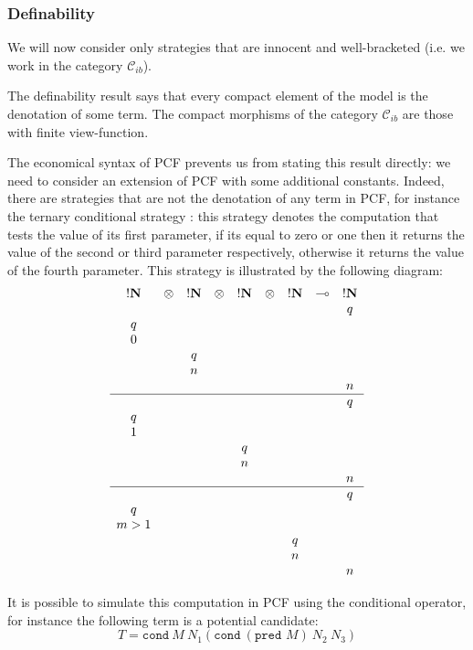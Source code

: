 \subsubsection{Definability}

We will now consider only strategies that are innocent and
well-bracketed (i.e. we work in the category $\mathcal{C}_{ib}$).

The definability result says that every compact element of the model
is the denotation of some term.
The compact morphisms of the category $\mathcal{C}_{ib}$ are those
with finite view-function.

The economical syntax of PCF prevents us from stating this
result directly: we need to consider an extension of PCF with some additional
constants. Indeed, there are strategies that are not the denotation of any term
in PCF, for instance the ternary conditional strategy : this
strategy denotes the computation that tests the value of its first
parameter, if its equal to zero or one then it returns the value of
the second or third parameter respectively, otherwise it returns the
value of the fourth parameter. This strategy is illustrated by the
following diagram:
$$
\begin{array}{ccccccccc}
!\bf N & \otimes & !\bf N & \otimes & !\bf N & \otimes & !\bf N & \multimap & !\bf N \\
&&&&&&&&q \\
q \\
0 \\
&& q \\
&& n \\
&&&&&&&&n \\
\hline
&&&&&&&&q \\
q \\
1 \\
&&&& q \\
&&&& n \\
&&&&&&&&n \\
\hline
&&&&&&&&q \\
q \\
m>1 \\
&&&&&& q \\
&&&&&& n \\
&&&&&&&&n \\
\end{array}
$$

It is possible to simulate this computation in PCF using the conditional operator, for instance the following term is a potential candidate:
$$ T = \texttt{cond}\ M\  N_1 (\texttt{cond}\  (\texttt{pred } M)\  N_2\  N_3)$$

